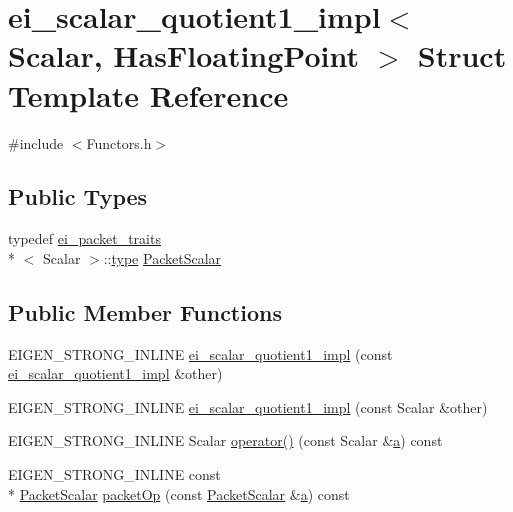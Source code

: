 \hypertarget{structei__scalar__quotient1__impl}{\section{ei\-\_\-scalar\-\_\-quotient1\-\_\-impl$<$ Scalar, Has\-Floating\-Point $>$ Struct Template Reference}
\label{structei__scalar__quotient1__impl}
}


{\ttfamily \#include $<$Functors.\-h$>$}

\subsection*{Public Types}
\begin{DoxyCompactItemize}
\item 
typedef \hyperlink{structei__packet__traits}{ei\-\_\-packet\-\_\-traits}\\*
$<$ Scalar $>$\-::\hyperlink{glext_8h_a7d05960f4f1c1b11f3177dc963a45d86}{type} \hyperlink{structei__scalar__quotient1__impl_a89cd06ed6809fbe84652ae5f4e4687e9}{Packet\-Scalar}
\end{DoxyCompactItemize}
\subsection*{Public Member Functions}
\begin{DoxyCompactItemize}
\item 
E\-I\-G\-E\-N\-\_\-\-S\-T\-R\-O\-N\-G\-\_\-\-I\-N\-L\-I\-N\-E \hyperlink{structei__scalar__quotient1__impl_a45130898ea24482ceeabc3dec9779fa5}{ei\-\_\-scalar\-\_\-quotient1\-\_\-impl} (const \hyperlink{structei__scalar__quotient1__impl}{ei\-\_\-scalar\-\_\-quotient1\-\_\-impl} \&other)
\item 
E\-I\-G\-E\-N\-\_\-\-S\-T\-R\-O\-N\-G\-\_\-\-I\-N\-L\-I\-N\-E \hyperlink{structei__scalar__quotient1__impl_af695017b155a9c9e163cad1a6bf59dbc}{ei\-\_\-scalar\-\_\-quotient1\-\_\-impl} (const Scalar \&other)
\item 
E\-I\-G\-E\-N\-\_\-\-S\-T\-R\-O\-N\-G\-\_\-\-I\-N\-L\-I\-N\-E Scalar \hyperlink{structei__scalar__quotient1__impl_ade7109164cb0aac5d165a33ac87c44f8}{operator()} (const Scalar \&\hyperlink{glext_8h_ac8729153468b5dcf13f971b21d84d4e5}{a}) const 
\item 
E\-I\-G\-E\-N\-\_\-\-S\-T\-R\-O\-N\-G\-\_\-\-I\-N\-L\-I\-N\-E const \\*
\hyperlink{structei__scalar__quotient1__impl_a89cd06ed6809fbe84652ae5f4e4687e9}{Packet\-Scalar} \hyperlink{structei__scalar__quotient1__impl_af26bb02f3dc61f690e1afbd568134c4e}{packet\-Op} (const \hyperlink{structei__scalar__quotient1__impl_a89cd06ed6809fbe84652ae5f4e4687e9}{Packet\-Scalar} \&\hyperlink{glext_8h_ac8729153468b5dcf13f971b21d84d4e5}{a}) const 
\end{DoxyCompactItemize}
